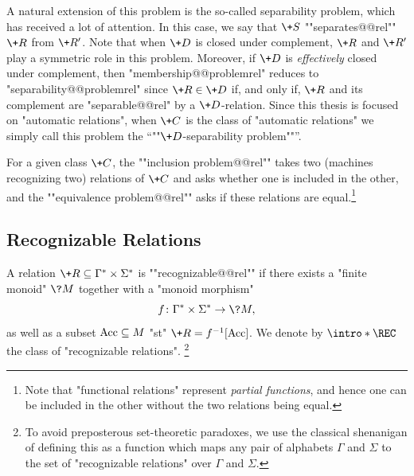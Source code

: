 A natural extension of this problem is the so-called separability problem,
which has received a lot of attention.
In this case, we say that $\+S$ ""separates@@rel"" $\+R$ from $\+R'$.
Note that when $\+D$ is closed under complement, $\+R$ and $\+R'$ play a symmetric role in this problem. Moreover, if $\+D$ is \emph{effectively} closed under complement,
then "membership@@problemrel" reduces to "separability@@problemrel" 
since $\+R \in \+D$ if, and only if, $\+R$ and its complement are "separable@@rel" by
a $\+D$-relation.
Since this thesis is focused on "automatic relations",
when $\+C$ is the class of "automatic relations" we simply call this problem
the \AP``""$\+D$-separability problem""''.

For a given class $\+C$, the \AP""inclusion problem@@rel"" takes two (machines recognizing two) 
relations of $\+C$ and asks whether one is included in the other, and the \AP""equivalence 
problem@@rel"" asks if these relations are equal.\footnote{Note that "functional relations"
represent \emph{partial functions}, and hence one can be included in the other without the
two relations being equal.}



\subsection{Recognizable Relations}

A relation $\+R \subseteq \Gamma^* \times \Sigma^*$ is \AP""recognizable@@rel""
if there exists a "finite monoid" $\?M$ together with a "monoid morphism"
\[
	f\colon \Gamma^* \times \Sigma^* \to \?M,
\]
as well as a subset $\textrm{Acc} \subseteq M$ "st"
$\+R = f^{-1}[\Acc]$. We denote by \AP$\intro*\REC$ the class of "recognizable relations".%
\footnote{To avoid preposterous set-theoretic paradoxes, 
we use the classical shenanigan of defining this as a function which maps
any pair of alphabets $\Gamma$ and $\Sigma$ to the set of "recognizable relations" over $\Gamma$ and $\Sigma$.}

